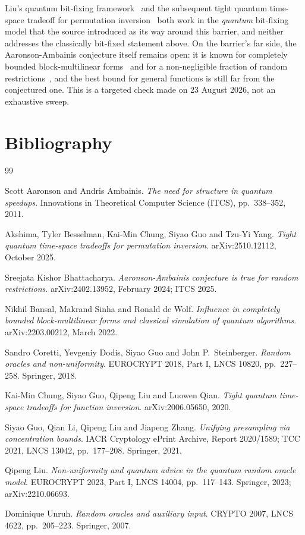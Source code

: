 \documentclass{conjura-conjecture}
\begin{document}
\begin{remark}\label{rem:since}
Liu's quantum bit-fixing framework~\cite{Liu23} and the subsequent tight
quantum time-space tradeoff for permutation inversion~\cite{ABCGY25}
both work in the \emph{quantum} bit-fixing model that the source
introduced as its way around this barrier, and neither addresses the
classically bit-fixed statement above. On the barrier's far side, the
Aaronson-Ambainis conjecture itself remains open: it is known for
completely bounded block-multilinear forms~\cite{BSW22} and for a
non-negligible fraction of random restrictions~\cite{Bha24}, and the
best bound for general functions is still far from the conjectured one.
This is a targeted check made on 23 August 2026, not an exhaustive
sweep.
\end{remark}

\section{Bibliography}

\begin{conjurabibliography}{99}

Scott Aaronson and Andris Ambainis.
\emph{The need for structure in quantum speedups}.
Innovations in Theoretical Computer Science (ITCS), pp.\ 338--352,
2011.

Akshima, Tyler Besselman, Kai-Min Chung, Siyao Guo and Tzu-Yi Yang.
\emph{Tight quantum time-space tradeoffs for permutation inversion}.
arXiv:2510.12112, October 2025.

Sreejata Kishor Bhattacharya.
\emph{Aaronson-Ambainis conjecture is true for random restrictions}.
arXiv:2402.13952, February 2024; ITCS 2025.

Nikhil Bansal, Makrand Sinha and Ronald de Wolf.
\emph{Influence in completely bounded block-multilinear forms and
classical simulation of quantum algorithms}.
arXiv:2203.00212, March 2022.

Sandro Coretti, Yevgeniy Dodis, Siyao Guo and John P.\ Steinberger.
\emph{Random oracles and non-uniformity}.
EUROCRYPT 2018, Part I, LNCS 10820, pp.\ 227--258. Springer, 2018.

Kai-Min Chung, Siyao Guo, Qipeng Liu and Luowen Qian.
\emph{Tight quantum time-space tradeoffs for function inversion}.
arXiv:2006.05650, 2020.

Siyao Guo, Qian Li, Qipeng Liu and Jiapeng Zhang.
\emph{Unifying presampling via concentration bounds}.
IACR Cryptology ePrint Archive, Report 2020/1589; TCC 2021, LNCS 13042,
pp.\ 177--208. Springer, 2021.

Qipeng Liu.
\emph{Non-uniformity and quantum advice in the quantum random oracle
model}.
EUROCRYPT 2023, Part I, LNCS 14004, pp.\ 117--143. Springer, 2023;
arXiv:2210.06693.

Dominique Unruh.
\emph{Random oracles and auxiliary input}.
CRYPTO 2007, LNCS 4622, pp.\ 205--223. Springer, 2007.

\end{conjurabibliography}
\end{document}
